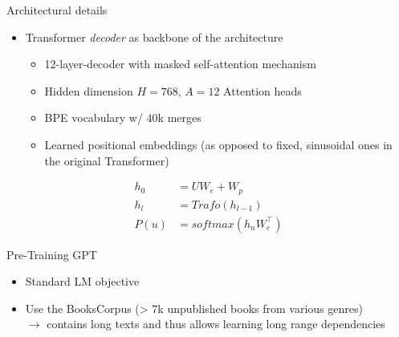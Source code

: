 \begin{vbframe}{Architectural details}

\vfill

	\begin{itemize}
		\item Transformer \textit{decoder} as backbone of the architecture
			\begin{itemize}
				\item 12-layer-decoder with masked self-attention mechanism
				\item Hidden dimension $H = 768$, $A = 12$ Attention heads
				\item BPE vocabulary w/ 40k merges
				\item Learned positional embeddings (as opposed to fixed, sinusoidal ones in the original Transformer)
			\end{itemize}
	\end{itemize}

\begin{align*}
	h_0 &= U W_e + W_p \\
	h_l &= Trafo(h_{l-1}) \\
	P(u) &= softmax(h_n W_e^\top)
\end{align*}

\vfill

\end{vbframe}


\begin{vbframe}{Pre-Training GPT}

\vfill

\begin{itemize}
		\item Standard LM objective
		\item Use the BooksCorpus (> 7k unpublished books from various genres) \\
					$\to$ contains long texts and thus allows learning long range dependencies
\end{itemize}

\vfill

\end{vbframe}


